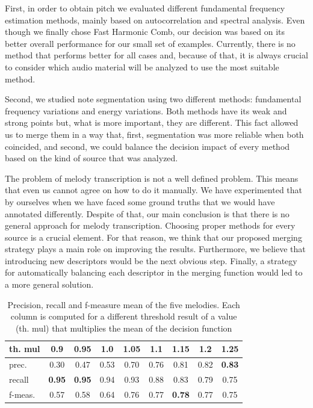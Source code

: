 \documentclass{article}
\begin{document}
First, in order to obtain pitch we evaluated different fundamental frequency estimation methods, mainly based on autocorrelation and spectral analysis.
Even though we finally chose Fast Harmonic Comb, our decision was based on its better overall performance for our small set of examples.
Currently, there is no method that performs better for all cases and, because of that, it is always crucial to consider which audio material
will be analyzed to use the most suitable method.

Second, we studied note segmentation using two different methods: fundamental frequency variations and energy variations.
Both methods have its weak and strong points but, what is more important, they are different.
This fact allowed us to merge them in a way that, first, segmentation was more reliable when both coincided,
and second, we could balance the decision impact of every method based on the kind of source that was analyzed.

The problem of melody transcription is not a well defined problem.
This means that even us cannot agree on how to do it manually. 
We have experimented that by ourselves when we have faced some ground truths that we would have annotated differently.
Despite of that, our main conclusion is that there is no general approach for melody transcription.
Choosing proper methods for every source is a crucial element.
For that reason, we think that our proposed merging strategy plays a main role on improving the results.
Furthermore, we believe that introducing new descriptors would be the next obvious step.
Finally, a strategy for automatically balancing each descriptor in the merging function would led to a more general solution.

\begin{table}
 \begin{center}
 \begin{tabular}{|l|c|c|c|c|c|c|c|c|}
  \hline
  th. mul	&	0.9				&	0.95				&	1.0		&	1.05		&	1.1		&	1.15				&	1.2		&	1.25 \\
  \hline
  prec.		&	0.30				&	0.47				&	0.53		&	0.70		&	0.76		&	0.81				&	0.82		&	\textbf{0.83} \\
  recall 	&	\textbf{0.95}	&	\textbf{0.95}	&	0.94		&	0.93		&	0.88		&	0.83				&	0.79		&	0.75 \\
  f-meas.	&	0.57				&	0.58				&	0.64		&	0.76		&	0.77 	&	\textbf{0.78}	&	0.77		&	0.75 \\  
  \hline
 \end{tabular}
\end{center}
 \caption{Precision, recall and f-measure mean of the five melodies.
 Each column is computed for a different threshold result of a value (th. mul) that multiplies the mean of the decision function}
 \label{tab:autofmeasure}
\end{table}
\end{document}
